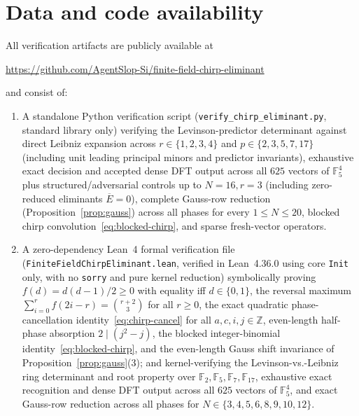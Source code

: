 \documentclass[11pt,reqno]{amsart}
\numberwithin{equation}{section}
\theoremstyle{definition}
\theoremstyle{remark}
\newcommand{\F}{\mathbb{F}}
\newcommand{\Z}{\mathbb{Z}}
\begin{document}
\section*{Data and code availability}
All verification artifacts are publicly available at
\begin{center}
\url{https://github.com/AgentSlop-Si/finite-field-chirp-eliminant}
\end{center}
and consist of:
\begin{enumerate}[label=(\arabic*),leftmargin=2em]
\item A standalone Python verification script (\texttt{verify\_chirp\_eliminant.py}, standard library only) verifying the Levinson-predictor determinant against direct Leibniz expansion across $r\in\{1,2,3,4\}$ and $p\in\{2,3,5,7,17\}$ (including unit leading principal minors and predictor invariants), exhaustive exact decision and accepted dense DFT output across all $625$ vectors of $\F_5^4$ plus structured/adversarial controls up to $N=16, r=3$ (including zero-reduced eliminants $\overline{E}=0$), complete Gauss-row reduction (Proposition~\ref{prop:gauss}) across all phases for every $1\le N\le 20$, blocked chirp convolution~\eqref{eq:blocked-chirp}, and sparse fresh-vector operators.
\item A zero-dependency Lean~4 formal verification file (\texttt{FiniteFieldChirpEliminant.lean}, verified in Lean~4.36.0 using core \texttt{Init} only, with no \texttt{sorry} and pure kernel reduction) symbolically proving $f(d)=d(d-1)/2\ge 0$ with equality iff $d\in\{0,1\}$, the reversal maximum $\sum_{i=0}^r f(2i-r)=\binom{r+2}{3}$ for all $r\ge 0$, the exact quadratic phase-cancellation identity~\eqref{eq:chirp-cancel} for all $a,c,i,j\in\Z$, even-length half-phase absorption $2\mid (j^2-j)$, the blocked integer-binomial identity~\eqref{eq:blocked-chirp}, and the even-length Gauss shift invariance of Proposition~\ref{prop:gauss}(3); and kernel-verifying the Levinson-vs.-Leibniz ring determinant and root property over $\F_2,\F_5,\F_7,\F_{17}$, exhaustive exact recognition and dense DFT output across all $625$ vectors of $\F_5^4$, and exact Gauss-row reduction across all phases for $N\in\{3,4,5,6,8,9,10,12\}$.
\end{enumerate}



\end{document}
